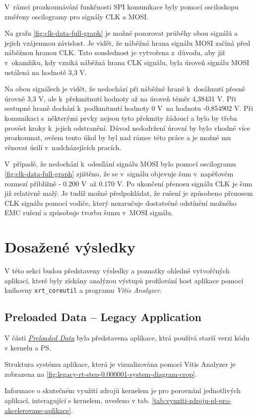 \documentclass[a4paper, twoside, 11pt]{article}
\newcommand{\fbar}{\FloatBarrier}
\begin{document}
	V~rámci prozkoumávání funkčnosti SPI komunikace byly pomocí osciloskopu změřeny oscilogramy pro signály \textcolor{ctublue}{CLK} a \textcolor{ctured}{MOSI}.\par
	Na grafu \ref{fig:clk-data-full-graph} je možné pozorovat průběhy obou signálů a jejich vzájemnou závislost. Je vidět, že náběžná hrana signálu MOSI začíná před náběžnou hranou CLK. Tato souslednost je vytvořena z~důvodu, aby již v~okamžiku, kdy vzniká náběžná hrana \textcolor{ctublue}{CLK} signálu, byla úroveň signálu \textcolor{ctured}{MOSI} ustálená na hodnotě 3,3 V.\par
	Na obou signálech je vidět, že nedochází při náběžné hraně k~dosáhnutí přesně úrovně 3,3 V, ale k~překmitnutí hodnoty až na úroveň téměr 4,38431 V. Při sestupné hraně dochází k~podkmitnutí hodnoty 0 V~na hodnotu -0,854902 V. Při komunikaci s~některými prvky nejsou tyto překmity žádoucí a bylo by třeba provést kroky k~jejich odstranění. Důvod nedodržení úrovní by bylo vhodné více prozkoumat, ovšem tento úkol by byl nad rámec této práce a je možné mu věnovat úsilí v~nadcházejících pracích.\par
	V~případě, že nedochází k~odesílání signálu \textcolor{ctured}{MOSI} bylo pomocí oscilogramu \ref{fig:clk-data-full-graph} zjištěno, že se v~signálu objevuje šum v~napěťovém rozmezí přibližně - 0.200 V~až 0.170 V. Po ukončení přenosu signálu \textcolor{ctublue}{CLK} je šum již relativně malý. Je tudíž možné předpokládat, že rušení je způsobeno přenosem \textcolor{ctublue}{CLK} signálu pomocí vodiče, který nezaručuje dostatečné odstínění možného EMC rušení a způsobuje tvorbu šumu v~\textcolor{ctured}{MOSI} signálu.

	\fbar
\section{Dosažené výsledky}
V této sekci budou představeny výsledky a poznatky ohledně vytvořčných aplikací, které byly získány analýzou výstupů profilování host aplikace pomocí knihovny \texttt{xrt\_coreutil} a programu \textit{Vitis Analyzer}.\par

	\subsection{Preloaded Data – Legacy Application}\label{subsec:dosazene-vysledky-preloaded-data-legacy-application}
		V části \hyperref[subsec:preloaded-data]{\textit{Preloaded Data}} byla představena aplikace, ktrá používá starší verzi kódu v kernelu a PS.\par
		Struktura systému aplikace, která je vizualizována pomocí Vitis Analyzer je zobrazena na \ref{fig:legacy-rt-step-0.000001-system-diagram-crop}.\par
		Informace o skutečném využití zdrojů kernelem je pro porovnání jednotlivých aplikací, interagující s kernelem, uvedeno v tab. \ref{tab:vyuziti-zdroju-pl-pro-akcelerovane-aplikace}.
\end{document}
